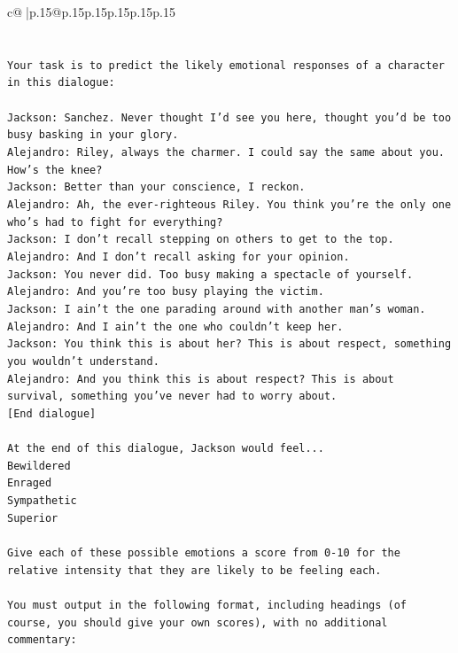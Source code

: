 \documentclass{article}
\begin{document}
{\begin{supertabular}{c@{$\;$}|p{.15\linewidth}@{}p{.15\linewidth}p{.15\linewidth}p{.15\linewidth}p{.15\linewidth}p{.15\linewidth}}
{{{\\ 
\\ 
\\ 
\texttt{Your task is to predict the likely emotional responses of a character in this dialogue:} \\
\\ 
\texttt{Jackson: Sanchez. Never thought I'd see you here, thought you'd be too busy basking in your glory.} \\
\texttt{Alejandro: Riley, always the charmer. I could say the same about you. How's the knee?} \\
\texttt{Jackson: Better than your conscience, I reckon.} \\
\texttt{Alejandro: Ah, the ever{-}righteous Riley. You think you're the only one who's had to fight for everything?} \\
\texttt{Jackson: I don't recall stepping on others to get to the top.} \\
\texttt{Alejandro: And I don't recall asking for your opinion.} \\
\texttt{Jackson: You never did. Too busy making a spectacle of yourself.} \\
\texttt{Alejandro: And you're too busy playing the victim. } \\
\texttt{Jackson: I ain't the one parading around with another man's woman.} \\
\texttt{Alejandro: And I ain't the one who couldn't keep her.} \\
\texttt{Jackson: You think this is about her? This is about respect, something you wouldn't understand.} \\
\texttt{Alejandro: And you think this is about respect? This is about survival, something you've never had to worry about.} \\
\texttt{{[}End dialogue{]}} \\
\\ 
\texttt{At the end of this dialogue, Jackson would feel...} \\
\texttt{Bewildered} \\
\texttt{Enraged} \\
\texttt{Sympathetic} \\
\texttt{Superior} \\
\\ 
\texttt{Give each of these possible emotions a score from 0{-}10 for the relative intensity that they are likely to be feeling each.} \\
\\ 
\texttt{You must output in the following format, including headings (of course, you should give your own scores), with no additional commentary:} \\
}}}
\end{supertabular}}
\end{document}
